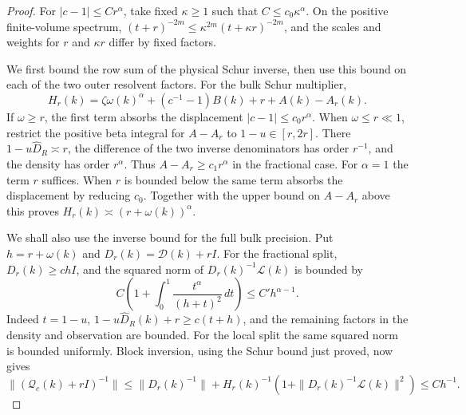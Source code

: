 \documentclass[11pt]{article}
\theoremstyle{definition}
\begin{document}
\begin{proof}
For \(|c-1|\le C r^\alpha\), take fixed \(\kappa\ge1\) such that
\(C\le c_0\kappa^\alpha\). On the positive finite-volume spectrum,
\((t+r)^{-2m}\le \kappa^{2m}(t+\kappa r)^{-2m}\), and the scales and
weights for \(r\) and \(\kappa r\) differ by fixed factors.

We first bound the row sum of the physical Schur inverse, then use
this bound on each of the two outer resolvent factors. For the bulk Schur multiplier,
\begin{equation}
 H_r(k)=\zeta\omega(k)^\alpha +(c^{-1}-1)B(k)+r+A(k)-A_r(k).
\end{equation}
If \(\omega\ge r\), the first term absorbs the displacement
\(|c-1|\le c_0 r^\alpha\). When \(\omega\le r\ll1\), restrict the
positive beta integral for \(A-A_r\) to \(1-u\in[r,2r]\).
There \(1-u\widehat D_R\asymp r\), the difference of the two inverse
denominators has order \(r^{-1}\), and the density has order
\(r^\alpha\). Thus \(A-A_r\ge c_1 r^\alpha\) in the fractional
case. For \(\alpha=1\) the term \(r\) suffices. When \(r\) is bounded
below the same term absorbs the displacement by reducing \(c_0\).
Together with the upper bound on \(A-A_r\) above this proves
\(H_r(k)\asymp(r+\omega(k))^\alpha\).

We shall also use the inverse bound for the full bulk precision.
Put \(h=r+\omega(k)\) and \(D_r(k)=\mathcal D(k)+rI\). For the
fractional split, \(D_r(k)\ge c h I\), and the squared norm of
\(D_r(k)^{-1}\mathcal L(k)\) is bounded by
\begin{equation}
 C\left(1+\int_0^1\frac{t^\alpha}{(h+t)^2}\,dt\right)
 \le C' h^{\alpha-1}.
\end{equation}
Indeed \(t=1-u\), \(1-u\widehat D_R(k)+r\ge c(t+h)\), and the
remaining factors in the density and observation are bounded.
For the local split the same squared norm is bounded uniformly.
Block inversion, using the Schur bound just proved, now gives
\begin{equation}
 \|(\mathcal Q_c(k)+rI)^{-1}\|
 \le \|D_r(k)^{-1}\|+
       H_r(k)^{-1}(1+\|D_r(k)^{-1}\mathcal L(k)\|^2)
 \le C h^{-1}.
\end{equation}


\end{proof}
\end{document}
